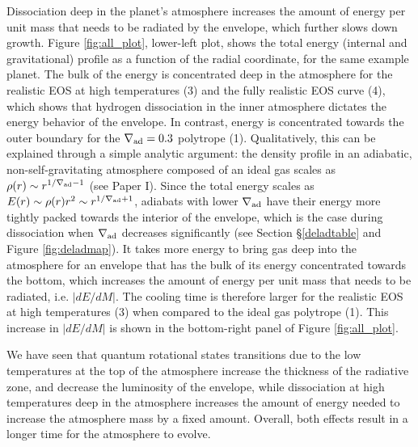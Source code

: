\documentclass[apj]{emulateapj}
\newcommand{\delad}{\nabla_{\rm ad}}
\begin{document}

Dissociation deep in the planet's atmosphere increases the amount of energy per unit mass that needs to be radiated by the envelope, which further slows down growth. Figure \ref{fig:all_plot}, lower-left plot, shows the total energy (internal and gravitational) profile as a function of the radial coordinate, for the same example planet. The bulk of the energy is concentrated deep in the atmosphere for the realistic EOS at high temperatures (3) and the fully realistic EOS curve (4), which shows that hydrogen dissociation in the inner atmosphere dictates the energy behavior of the envelope. In contrast, energy is concentrated towards the outer boundary for the $\delad=0.3$ polytrope (1). Qualitatively, this can be explained through a simple analytic argument: the density profile in an adiabatic, non-self-gravitating atmosphere composed of an ideal gas scales as $\rho(r) \sim r^{1/\delad-1}$ (see Paper I). Since the total energy scales as $E(r) \sim \rho(r) r^2 \sim r^{1/\delad+1}$, adiabats with lower $\delad$ have their energy more tightly packed towards the interior of the envelope, which is the case during dissociation when $\delad$ decreases significantly (see Section \S\ref{deladtable} and Figure \ref{fig:deladmap}).  It takes more energy to bring gas deep into the atmosphere for an envelope that has the bulk of its energy concentrated towards the bottom,  which increases the amount of energy per unit mass that needs to be radiated, i.e. $|dE/dM|$. The cooling time is therefore larger for the realistic EOS at high temperatures (3) when compared to the ideal gas polytrope (1). This increase in $|dE/dM|$ is shown in the bottom-right panel of Figure \ref{fig:all_plot}.

We have seen that quantum rotational states transitions due to the low temperatures at the top of the atmosphere increase the thickness of the radiative zone, and decrease the luminosity of the envelope, while dissociation at high temperatures deep in the atmosphere increases the amount of energy needed to increase the atmosphere mass by a fixed amount. Overall, both effects result in a longer time for the atmosphere to evolve. 
\end{document}
